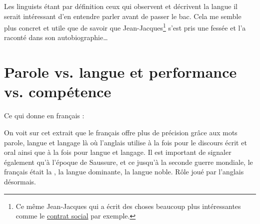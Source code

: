 Les \glspl{linguist} étant par définition ceux qui observent et décrivent la
langue il serait intéressant d'en entendre parler avant de passer le
bac. Cela me semble plus concret et utile que de savoir que
Jean-Jacques\footnote{Ce même Jean-Jacques qui a écrit des choses
  beaucoup plus intéressantes comme le \href{https://www.rousseauonline.ch/pdf/rousseauonline-0004.pdf}{contrat social} par exemple.} s'est pris une fessée et l'a raconté dans son autobiographie\dots{}

\newpage
\section{Parole vs. langue et performance vs. compétence}

\begin{center}
\begin{mdframed}[style=citestyle, frametitle={Extrait de~\cite{burleigh}}]
\end{mdframed}  
\end{center}


Ce qui donne en français :

\begin{center}
\begin{mdframed}[style=tradstyle, frametitle={\exFR{Traduction} de l'extrait précédent}]
\end{mdframed}  
\end{center}


On voit sur cet extrait que le français offre plus de précision grâce
aux mots parole, langue et langage là où l'anglais utilise
 à la fois pour le discours écrit et oral ainsi que
 à la fois pour langue et langage. Il est important de
signaler également qu'à l'époque de Saussure, et ce jusqu'à la seconde
guerre mondiale, le français était la , la langue
dominante, la langue noble. Rôle joué par l'anglais désormais. 

